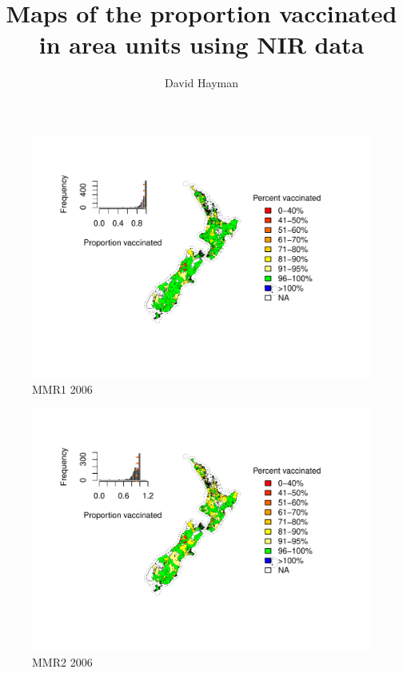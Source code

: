 \documentclass{article}
\begin{document}
\title{Maps of the proportion vaccinated in area units using NIR data}
\author{David Hayman}

\maketitle
\newpage
\begin{figure}
    \centering
    \includegraphics[width=5.0in]{nir_census_MMR1_NIR_2006.pdf}
    \caption{MMR1 2006}
\end{figure}

\begin{figure}
    \centering
    \includegraphics[width=5.0in]{nir_census_MMR2_NIR_2006.pdf}
    \caption{MMR2 2006}
\end{figure}
\end{document}
